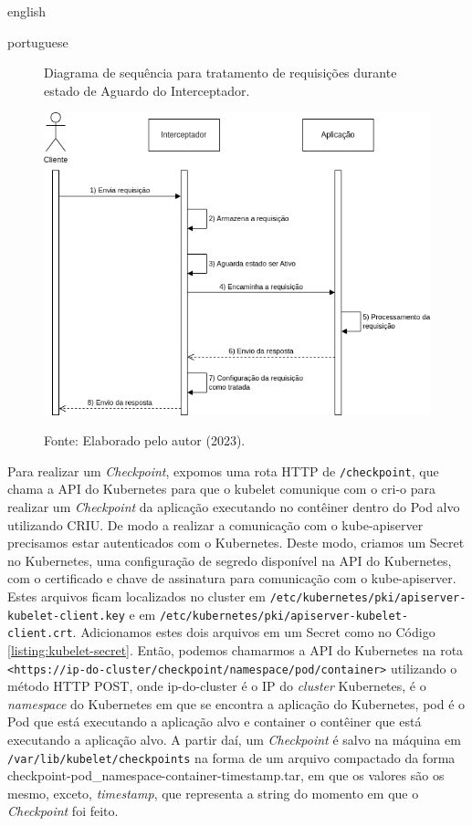 \begin{otherlanguage*}{english}
\begin{otherlanguage*}{portuguese}
\begin{figure}[h]
\centering
\caption{Diagrama de sequência para tratamento de requisições durante estado de Aguardo do Interceptador.}
\includegraphics[scale=0.64]{images/wait-state.png}
\label{fig:diagram-wait-state-interceptor}
\caption*{Fonte: Elaborado pelo autor (2023).}
\end{figure}

Para realizar um \textit{Checkpoint}, expomos uma rota HTTP de \texttt{/checkpoint}, que
chama a API do Kubernetes para que o kubelet comunique com o cri-o para realizar um 
\textit{Checkpoint} da aplicação executando no contêiner dentro do Pod alvo utilizando
CRIU. De modo a realizar a comunicação com o kube-apiserver precisamos estar autenticados
com o Kubernetes. Deste modo, criamos um Secret no Kubernetes, uma configuração de segredo
disponível na API do Kubernetes, com o certificado e chave de assinatura para comunicação
com o kube-apiserver. Estes arquivos ficam localizados no cluster em
\texttt{/etc/kubernetes/pki/apiserver-kubelet-client.key} e em
\texttt{/etc/kubernetes/pki/apiserver-kubelet-client.crt}. Adicionamos estes dois arquivos em um
Secret como no Código \ref{listing:kubelet-secret}. Então, podemos chamarmos a API
do Kubernetes na rota \texttt{<https://ip-do-cluster/checkpoint/namespace/pod/container>}
utilizando o método HTTP POST, onde ip-do-cluster é o IP do \textit{cluster} Kubernetes,
é o \textit{namespace} do Kubernetes em que se encontra a aplicação do Kubernetes, pod é
o Pod que está executando a aplicação alvo e container o contêiner que está executando a
aplicação alvo. A partir daí, um \textit{Checkpoint} é salvo na máquina em
\texttt{/var/lib/kubelet/checkpoints} na forma de um arquivo compactado da forma
checkpoint-pod\_namespace-container-timestamp.tar, em que os valores são os mesmo,
exceto, \textit{timestamp}, que representa a string do momento em que o \textit{Checkpoint}
foi feito.


\end{otherlanguage*}
\end{otherlanguage*}
